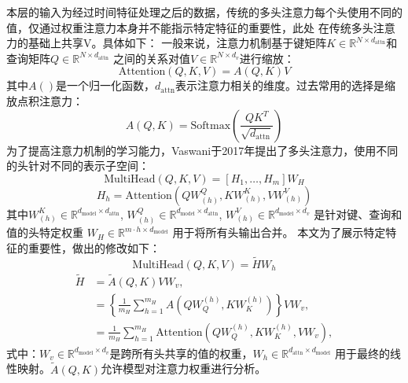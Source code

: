 本层的输入为经过时间特征处理之后的数据，传统的多头注意力每个头使用不同的值，仅通过权重注意力本身并不能指示特定特征的重要性，此处
在传统多头注意力的基础上共享V。具体如下：
一般来说，注意力机制基于键矩阵\( K \in \mathbb{R}^{N \times d_{\text{attn}}} \)和查询矩阵\( Q \in \mathbb{R}^{N \times d_{\text{attn}}} \)
之间的关系对值\( V \in \mathbb{R}^{N \times d_v} \)进行缩放：
\begin{equation}
    \text{Attention}(Q, K, V) = A(Q,K)V
\end{equation}
其中$A()$是一个归一化函数，$d_{\text{attn}}$表示注意力相关的维度。过去常用的选择是缩放点积注意力：
\begin{equation}
    A(Q, K) = \text{Softmax}\left(\frac{QK^T}{\sqrt{d_{\text{attn}}}}\right)
\end{equation}
为了提高注意力机制的学习能力，Vaswani于2017年提出了多头注意力，使用不同的头针对不同的表示子空间：
\begin{equation}
    \text{MultiHead}(Q, K, V) = [H_1, \ldots, H_m]W_H
\end{equation}
\begin{equation}
    H_h = \text{Attention}(QW^Q_{(h)}, KW^K_{(h)}, VW^V_{(h)})
\end{equation}
其中\( W^K_{(h)} \in \mathbb{R}^{d_{\text{model}} \times d_{\text{attn}}} \), \( W^Q_{(h)} \in \mathbb{R}^{d_{\text{model}} \times d_{\text{attn}}} \), \( W^V_{(h)} \in \mathbb{R}^{d_{\text{model}} \times d_v} \) 
是针对键、查询和值的头特定权重 \( W_H \in \mathbb{R}^{m \cdot h \times d_{\text{model}}} \) 用于将所有头输出合并。
本文为了展示特定特征的重要性，做出的修改如下：
\begin{equation}
    \text{MultiHead}({Q}, {K}, {V}) = \tilde{{H}} {W}_h
\end{equation}
\begin{equation}
    \begin{aligned}
        {\tilde{H}} &= \tilde{A}({Q}, {K}) {V} {W}_v, \\
        &= \left\{ \frac{1}{m_H} \sum_{h=1}^{m_H} A({Q} {W}_Q^{(h)}, {K} {W}_K^{(h)}) \right\} {V} {W}_v, \\
        &= \frac{1}{m_H} \sum_{h=1}^{m_H} \text{Attention}({Q} {W}_Q^{(h)}, {K} {W}_K^{(h)}, {V} {W}_v),
    \end{aligned}        
\end{equation}
式中：${W}_v \in \mathbb{R}^{d_{\text{model}} \times d_v}$是跨所有头共享的值的权重，${W}_h \in \mathbb{R}^{d_{\text{attn}} \times d_{\text{model}}}$
用于最终的线性映射。$\tilde{A}({Q}, {K})$允许模型对注意力权重进行分析。

